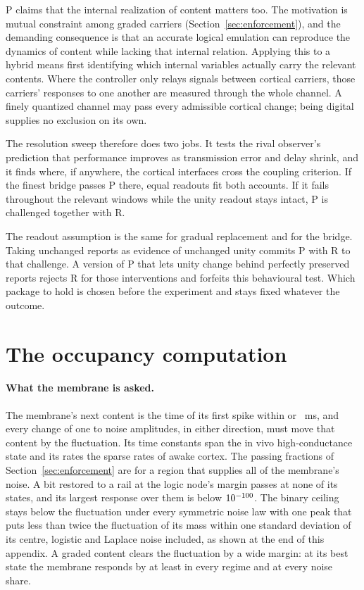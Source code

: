 \documentclass[12pt]{article}
\begin{document}
P claims that the internal realization of content matters too. The motivation
is mutual constraint among graded carriers (Section~\ref{sec:enforcement}), and
the demanding consequence is that an accurate logical emulation can reproduce
the dynamics of content while lacking that internal relation. Applying this to
a hybrid means first identifying which internal variables actually carry the
relevant contents. Where the controller only relays signals between cortical
carriers, those carriers' responses to one another are measured through the
whole channel. A finely quantized channel may pass every admissible cortical
change; being digital supplies no exclusion on its own.

The resolution sweep therefore does two jobs. It tests the rival observer's
prediction that performance improves as transmission error and delay shrink,
and it finds where, if anywhere, the cortical interfaces cross the coupling
criterion. If the finest bridge passes P there, equal readouts fit both
accounts. If it fails throughout the relevant windows while the unity readout
stays intact, P is challenged together with R.

The readout assumption is the same for gradual replacement and for the bridge.
Taking unchanged reports as evidence of unchanged unity commits P with R to
that challenge. A version of P that lets unity change behind perfectly
preserved reports rejects R for those interventions and forfeits this
behavioural test. Which package to hold is chosen before the experiment and
stays fixed whatever the outcome.

\section{The occupancy computation}
\label{app:occupancy}

\paragraph{What the membrane is asked.} The membrane's next content is the time
of its first spike within \uOccNextShort{} or \uOccNextLong{}~ms, and every
change of one to \uOccShiftMax{} noise amplitudes, in either direction, must move
that content by the fluctuation. Its time constants span the in vivo
high-conductance state and its rates the sparse rates of awake cortex. The
passing fractions of Section~\ref{sec:enforcement} are for a region that
supplies all of the membrane's noise. A bit restored to a rail at the logic
node's margin passes at none of its states, and its largest response over them
is below $10^{-100}$. The binary ceiling stays below the fluctuation
under every symmetric noise law with one peak that puts less than twice the
fluctuation of its mass within one standard deviation of its centre, logistic
and Laplace noise included, as shown at the end of this appendix. A graded
content clears the fluctuation by a wide margin: at its best state the membrane
responds by at least \uYardBestMin{} in every regime and at every noise share.
\end{document}
